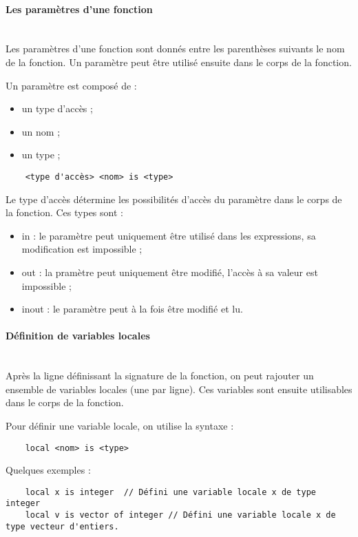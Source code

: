 \paragraph{Les paramètres d'une fonction}\mbox{} \\

Les paramètres d'une fonction sont donnés entre les parenthèses suivants le
nom de la fonction. Un paramètre peut être utilisé ensuite dans le corps de
la fonction.

Un paramètre est composé de :
\begin{itemize}
    \item un type d'accès ;
    \item un nom ;
    \item un type ;
\end{itemize}

\begin{verbatim}
    <type d'accès> <nom> is <type>
\end{verbatim}

Le type d'accès détermine les possibilités d'accès du paramètre dans le corps
de la fonction. Ces types sont :
\begin{itemize}
    \item in : le paramètre peut uniquement être utilisé dans les expressions,
          sa modification est impossible ;
    \item out : la pramètre peut uniquement être modifié, l'accès à sa
          valeur est impossible ;
    \item inout : le paramètre peut à la fois être modifié et lu.
\end{itemize}


\paragraph{Définition de variables locales}\mbox{} \\

Après la ligne définissant la signature de la fonction, on peut rajouter un
ensemble de variables locales (une par ligne). Ces variables sont ensuite
utilisables dans le corps de la fonction.

Pour définir une variable locale, on utilise la syntaxe :
\begin{verbatim}
    local <nom> is <type>
\end{verbatim}

Quelques exemples :
\begin{verbatim}
    local x is integer  // Défini une variable locale x de type integer
    local v is vector of integer // Défini une variable locale x de type vecteur d'entiers.
\end{verbatim}

